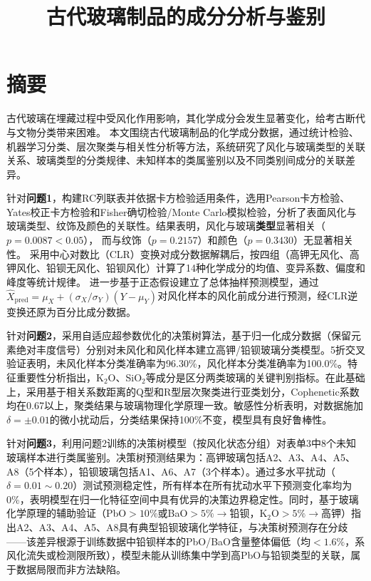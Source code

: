 \documentclass[12pt,a4paper]{ctexart}
\title{\vspace{-2cm}\textbf{古代玻璃制品的成分分析与鉴别}}
\author{}
\date{}
\begin{document}
\maketitle
\thispagestyle{empty}

\section*{摘\quad 要}
\thispagestyle{fancy}

古代玻璃在埋藏过程中受风化作用影响，其化学成分会发生显著变化，给考古断代与文物分类带来困难。
本文围绕古代玻璃制品的化学成分数据，通过统计检验、机器学习分类、层次聚类与相关性分析等方法，系统研究了风化与玻璃类型的关联关系、玻璃类型的分类规律、未知样本的类属鉴别以及不同类别间成分的关联差异。

针对\textbf{问题1}，构建RC列联表并依据卡方检验适用条件，选用Pearson卡方检验、
Yates校正卡方检验和Fisher确切检验/Monte Carlo模拟检验，分析了表面风化与玻璃类型、纹饰及颜色的关联性。结果表明，风化与玻璃\textbf{类型}显著相关（$p=0.0087<0.05$），
而与纹饰（$p=0.2157$）和颜色（$p=0.3430$）无显著相关性。
采用中心对数比（CLR）变换对成分数据解耦后，按四组（高钾无风化、高钾风化、铅钡无风化、铅钡风化）计算了14种化学成分的均值、变异系数、偏度和峰度等统计规律。
进一步基于正态假设建立了总体抽样预测模型，通过$\hat{X}_{\text{pred}}=\mu_X+(\sigma_X/\sigma_Y)(Y-\mu_Y)$对风化样本的风化前成分进行预测，经CLR逆变换还原为百分比成分数据。

针对\textbf{问题2}，采用自适应超参数优化的决策树算法，基于归一化成分数据（保留元素绝对丰度信号）分别对未风化和风化样本建立高钾/铅钡玻璃分类模型。5折交叉验证表明，未风化样本分类准确率为96.30\%，风化样本分类准确率为100.0\%。特征重要性分析指出，K$_2$O、SiO$_2$等成分是区分两类玻璃的关键判别指标。在此基础上，采用基于相关系数距离的Q型和R型层次聚类进行亚类划分，Cophenetic系数均在0.67以上，聚类结果与玻璃物理化学原理一致。敏感性分析表明，对数据施加$\delta=\pm0.01$的微小扰动后，分类结果保持100\%不变，模型具有良好鲁棒性。

针对\textbf{问题3}，利用问题2训练的决策树模型（按风化状态分组）对表单3中8个未知玻璃样本进行类属鉴别。决策树预测结果为：高钾玻璃包括A2、A3、A4、A5、A8（5个样本），铅钡玻璃包括A1、A6、A7（3个样本）。通过多水平扰动（$\delta=0.01\sim0.20$）测试预测稳定性，所有样本在所有扰动水平下预测变化率均为0\%，表明模型在归一化特征空间中具有优异的决策边界稳定性。同时，基于玻璃化学原理的辅助验证（PbO$>10\%$或BaO$>5\%\rightarrow$铅钡，K$_2$O$>5\%\rightarrow$高钾）指出A2、A3、A4、A5、A8具有典型铅钡玻璃化学特征，与决策树预测存在分歧——该差异根源于训练数据中铅钡样本的PbO/BaO含量整体偏低（均$<1.6\%$，系风化流失或检测限所致），模型未能从训练集中学到高PbO与铅钡类型的关联，属于数据局限而非方法缺陷。
\end{document}
